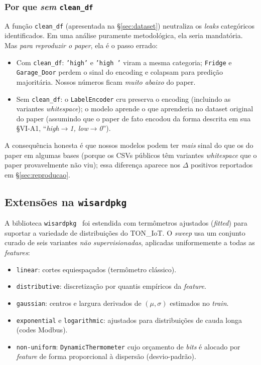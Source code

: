 \subsubsection{Por que \emph{sem} \texttt{clean\_df}}

A função \texttt{clean\_df} (apresentada na \S{}\ref{sec:dataset})
neutraliza os \emph{leaks} categóricos identificados. Em uma análise
puramente metodológica, ela seria mandatória. Mas \emph{para
reproduzir o paper}, ela é o passo errado:

\begin{itemize}[leftmargin=*,itemsep=0pt]
  \item Com \texttt{clean\_df}: \texttt{'high'} e \texttt{'high\ '}
        viram a mesma categoria; \texttt{Fridge} e \texttt{Garage\_Door}
        perdem o sinal do encoding e colapsam para predição
        majoritária. Nossos números ficam \emph{muito abaixo} do
        paper.
  \item Sem \texttt{clean\_df}: o \texttt{LabelEncoder} cru preserva
        o encoding (incluindo as variantes \emph{whitespace}); o
        modelo aprende o que aprenderia no dataset original do paper
        (assumindo que o paper de fato encodou da forma descrita em
        sua \S{}VI-A1, ``\emph{high$\rightarrow$1, low$\rightarrow$0}'').
\end{itemize}

A consequência honesta é que nossos modelos podem ter \emph{mais}
sinal do que os do paper em algumas bases (porque os CSVs públicos
têm variantes \emph{whitespace} que o paper provavelmente não viu);
essa diferença aparece nos $\Delta$ positivos reportados em
\S{}\ref{sec:reproducao}.

\subsection{Extensões na \texttt{wisardpkg}}

A biblioteca \texttt{wisardpkg}~\cite{wisardpkg} foi estendida com
termômetros ajustados (\emph{fitted}) para suportar a variedade de
distribuições do TON\_IoT. O \emph{sweep} usa um conjunto curado de
seis variantes \emph{não supervisionadas}, aplicadas uniformemente a
todas as \emph{features}:

\begin{itemize}[leftmargin=*,itemsep=0pt]
  \item \texttt{linear}: cortes equiespaçados (termômetro clássico).
  \item \texttt{distributive}: discretização por quantis empíricos
        da \emph{feature}.
  \item \texttt{gaussian}: centros e largura derivados de
        $(\mu, \sigma)$ estimados no \emph{train}.
  \item \texttt{exponential} e \texttt{logarithmic}: ajustados para
        distribuições de cauda longa (codes Modbus).
  \item \texttt{non-uniform}: \texttt{DynamicThermometer} cujo
        orçamento de \emph{bits} é alocado por \emph{feature} de forma
        proporcional à dispersão (desvio-padrão).
\end{itemize}

